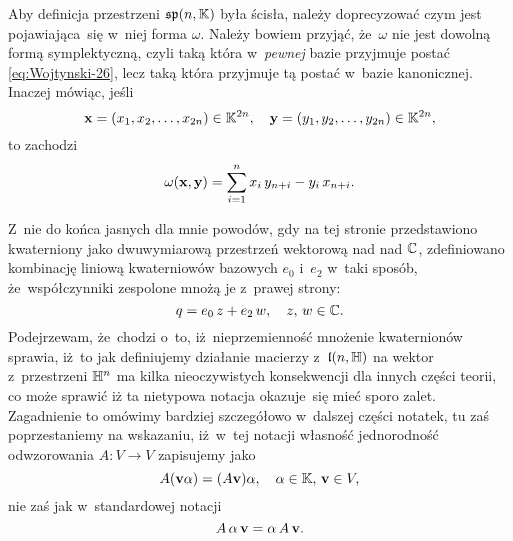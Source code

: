 \documentclass[a4paper,11pt]{article}
\begin{document}
\vspace{\spaceFour}





 Aby definicja przestrzeni $\mathfrak{sp}( n, \mathbb{K} )$ była
ścisła, należy doprecyzować czym jest pojawiająca~się w~niej forma $\omega$.
Należy bowiem przyjąć, że~$\omega$ nie jest dowolną formą symplektyczną, czyli
taką która w~\textit{pewnej} bazie przyjmuje postać
\eqref{eq:Wojtynski-26}, lecz taką która przyjmuje tą postać w~bazie
kanonicznej. Inaczej mówiąc, jeśli
\begin{equation}
  \label{eq:Wojtynski-30}
  \mathbf{x} = ( x_{ 1 }, x_{ 2 }, \ldots, x_{ 2n } ) \in \mathbb{K}^{ 2n }, \quad
  \mathbf{y} = ( y_{ 1 }, y_{ 2 }, \ldots, y_{ 2n } ) \in \mathbb{K}^{ 2n },
\end{equation}
to zachodzi
\begin{equation}
  \label{eq:Wojtynski-31}
  \omega( \mathbf{x}, \mathbf{y} ) =
  \sum_{ i = 1 }^{ n } x_{ i } \, y_{ n + i } - y_{ i } \, x_{ n + i }.
\end{equation}

\vspace{\spaceFour}





 Z~nie do końca jasnych dla mnie powodów, gdy na tej stronie
przedstawiono kwaterniony jako dwuwymiarową przestrzeń wektorową nad nad
$\mathbb{C}$, zdefiniowano kombinację liniową kwaterniowów bazowych $e_{ 0 }$
i~$e_{ 2 }$ w~taki sposób, że~współczynniki zespolone mnożą je z~prawej
strony:
\begin{equation}
  \label{eq:Wojtynski-32}
  q = e_{ 0 } \, z + e_{ 2 } \, w, \quad z, \, w \in \mathbb{C}.
\end{equation}
Podejrzewam, że~chodzi o~to, iż~nieprzemienność mnożenie kwaternionów
sprawia, iż~to jak definiujemy działanie macierzy z~$\mathfrak{l}( n, \mathbb{H} )$ na
wektor z~przestrzeni $\mathbb{H}^{ n }$ ma kilka nieoczywistych konsekwencji dla
innych części teorii, co może sprawić iż ta nietypowa notacja okazuje~się
mieć sporo zalet. Zagadnienie to omówimy bardziej szczegółowo w~dalszej
części notatek, tu zaś poprzestaniemy na wskazaniu, iż~w~tej notacji
własność jednorodność odwzorowania $A : V \to V$ zapisujemy jako
\begin{equation}
  \label{eq:Wojtynski-33}
  A ( \mathbf{v} \alpha ) = ( A \mathbf{v} ) \alpha, \quad
  \alpha \in \mathbb{K}, \, \mathbf{v} \in V,
\end{equation}
nie zaś jak w~standardowej notacji
\begin{equation}
  \label{eq:Wojtynski-34}
  A \, \alpha \, \mathbf{v} = \alpha \, A \, \mathbf{v}.
\end{equation}
\end{document}
